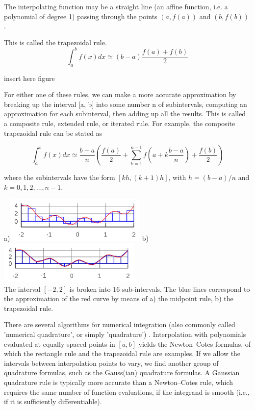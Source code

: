 The interpolating function may be a straight line (an affine function, i.e. a polynomial of degree 1)
passing through the points $(a, f(a))$ and $(b, f(b))$.

This is called the trapezoidal rule.  
\[
\int_a^b f(x)dx \simeq (b-a) \frac{f(a)+f(b)}{2}
\]

{\color{red} insert here figure}

For either one of these rules, we can make a more accurate approximation by breaking up the interval [a, b] into some number n of subintervals, computing an approximation for each subinterval, then adding up all the results. This is called a composite rule, extended rule, or iterated rule. For example, the composite trapezoidal rule can be stated as

\[
\int_a^b f(x)dx \simeq \frac{b-a}{n} \left( \frac{f(a)}{2}  
+\sum_{k=1}^{n-1} f(a+k\frac{b-a}{n})
   +\frac{f(b)}{2} \right)
\]

where the subintervals have the form $[kh,(k+1)h]$, with $h=(b-a)/n$ and $k=0,1,2,\dots,n-1$.


\begin{center}
a)\includegraphics[width=7cm]{images/quadrature/int1}
b)\includegraphics[width=7cm]{images/quadrature/int2}\\
The interval $[-2,2]$ is broken into 16 sub-intervals. The blue lines correspond to the 
approximation of the red curve by means of a) the midpoint rule,  b) the trapezoidal rule.
\end{center}

There are several algorithms for numerical integration (also commonly called 'numerical quadrature', or
simply 'quadrature') .
Interpolation with polynomials evaluated at equally spaced points in $[a,b]$
yields the Newton–Cotes formulas, of which the rectangle rule and the trapezoidal rule are examples. 
If we allow the intervals between interpolation points to vary, we find another group of quadrature formulas, such as 
the Gauss(ian) quadrature formulas. 
A Gaussian quadrature rule is typically more accurate than a Newton–Cotes rule, 
which requires the same number of function evaluations, if the integrand is smooth 
(i.e., if it is sufficiently differentiable).


